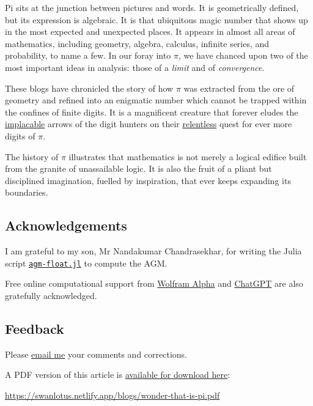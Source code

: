 \documentclass[
  a4paper,
]{article}
\begin{document}
Pi sits at the junction between pictures and words. It is geometrically
defined, but its expression is algebraic. It is that ubiquitous magic
number that shows up in the most expected and unexpected places. It
appears in almost all areas of mathematics, including geometry, algebra,
calculus, infinite series, and probability, to name a few. In our foray
into \(\pi\), we have chanced upon two of the most important ideas in
analysis: those of a \emph{limit} and of \emph{convergence}.

These blogs have chronicled the story of how \(\pi\) was extracted from
the ore of geometry and refined into an enigmatic number which cannot be
trapped within the confines of finite digits. It is a magnificent
creature that forever eludes the
\href{https://www.thefreedictionary.com/implacable}{implacable} arrows
of the digit hunters on their
\href{https://www.collinsdictionary.com/dictionary/english/relentless}{relentless}
quest for ever more digits of \(\pi\).

The history of \(\pi\) illustrates that mathematics is not merely a
logical edifice built from the granite of unassailable logic. It is also
the fruit of a pliant but disciplined imagination, fuelled by
inspiration, that ever keeps expanding its boundaries.

\subsection{Acknowledgements}\label{acknowledgements}

I am grateful to my son, Mr Nandakumar Chandrasekhar, for writing the
Julia script \href{auxiliary/agm-float.jl}{\texttt{agm-float.jl}} to
compute the AGM.

Free online computational support from
\href{https://www.wolframalpha.com/}{Wolfram Alpha} and
\href{https://chatgpt.com/}{ChatGPT} are also gratefully acknowledged.

\subsection{Feedback}\label{feedback}

Please \href{mailto:feedback.swanlotus@gmail.com}{email me} your
comments and corrections.

\noindent A PDF version of this article is
\href{./wonder-that-is-pi.pdf}{available for download here}:

\begin{small}

\begin{sffamily}

\url{https://swanlotus.netlify.app/blogs/wonder-that-is-pi.pdf}

\end{sffamily}

\end{small}
\end{document}

